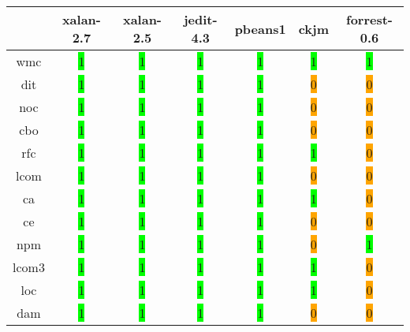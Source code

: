 \begin{table}[H]
\centering
    \begin{tabular}{|c|c|c|c|c|c|c|}
        \hline
         & xalan-2.7 & xalan-2.5 & jedit-4.3 & pbeans1 & ckjm & forrest-0.6 \\ \hline
        \acrshort{wmc} & \colorbox{lime}{1} & \colorbox{lime}{1} & \colorbox{lime}{1} & \colorbox{lime}{1} & \colorbox{lime}{1} & \colorbox{lime}{1} \\ \hline
        \acrshort{dit} & \colorbox{lime}{1} & \colorbox{lime}{1} & \colorbox{lime}{1} & \colorbox{lime}{1} & \colorbox{orange}{0} & \colorbox{orange}{0} \\ \hline
        \acrshort{noc} & \colorbox{lime}{1} & \colorbox{lime}{1} & \colorbox{lime}{1} & \colorbox{lime}{1} & \colorbox{orange}{0} & \colorbox{orange}{0} \\ \hline
        \acrshort{cbo} & \colorbox{lime}{1} & \colorbox{lime}{1} & \colorbox{lime}{1} & \colorbox{lime}{1} & \colorbox{orange}{0} & \colorbox{orange}{0} \\ \hline
        \acrshort{rfc} & \colorbox{lime}{1} & \colorbox{lime}{1} & \colorbox{lime}{1} & \colorbox{lime}{1} & \colorbox{lime}{1} & \colorbox{orange}{0} \\ \hline
        \acrshort{lcom} & \colorbox{lime}{1} & \colorbox{lime}{1} & \colorbox{lime}{1} & \colorbox{lime}{1} & \colorbox{orange}{0} & \colorbox{orange}{0} \\ \hline
        \acrshort{ca} & \colorbox{lime}{1} & \colorbox{lime}{1} & \colorbox{lime}{1} & \colorbox{lime}{1} & \colorbox{lime}{1} & \colorbox{orange}{0} \\ \hline
        \acrshort{ce} & \colorbox{lime}{1} & \colorbox{lime}{1} & \colorbox{lime}{1} & \colorbox{lime}{1} & \colorbox{orange}{0} & \colorbox{orange}{0} \\ \hline
        \acrshort{npm} & \colorbox{lime}{1} & \colorbox{lime}{1} & \colorbox{lime}{1} & \colorbox{lime}{1} & \colorbox{orange}{0} & \colorbox{lime}{1} \\ \hline
        \acrshort{lcom3} & \colorbox{lime}{1} & \colorbox{lime}{1} & \colorbox{lime}{1} & \colorbox{lime}{1} & \colorbox{lime}{1} & \colorbox{orange}{0} \\ \hline
        \acrshort{loc} & \colorbox{lime}{1} & \colorbox{lime}{1} & \colorbox{lime}{1} & \colorbox{lime}{1} & \colorbox{lime}{1} & \colorbox{orange}{0} \\ \hline
        \acrshort{dam} & \colorbox{lime}{1} & \colorbox{lime}{1} & \colorbox{lime}{1} & \colorbox{lime}{1} & \colorbox{orange}{0} & \colorbox{orange}{0} \\ \hline

\end{tabular}
\end{table}
